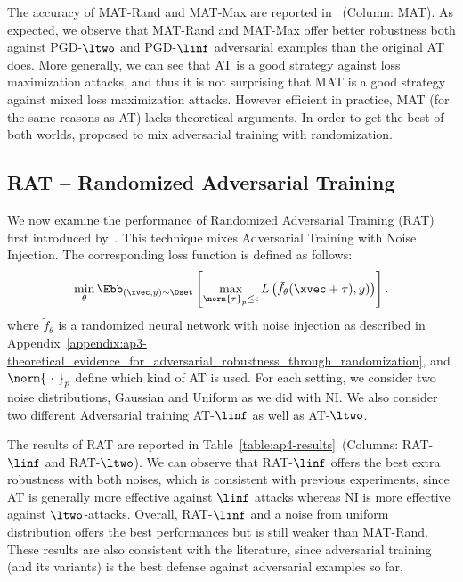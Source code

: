 The accuracy of MAT-Rand and MAT-Max are reported in~ (Column: MAT).
As expected, we observe that MAT-Rand and MAT-Max offer better robustness both against PGD-$\ltwo$ and PGD-$\linf$ adversarial examples than the original AT does.
More  generally, we can see that AT is a good strategy against loss maximization attacks, and thus it is not surprising that MAT is a good strategy against mixed loss maximization attacks.
However efficient in practice, MAT (for the same reasons as AT) lacks theoretical arguments.
In order to get the best of both worlds, \citet{salman2019provably} proposed to mix adversarial training with randomization.  


\subsection{RAT -- Randomized Adversarial Training}
\label{subsection:ap4-randomized_adversarial_training}

We now examine the performance of Randomized Adversarial Training (RAT) first introduced by~\citet{salman2019provably}.
This technique mixes Adversarial Training with Noise Injection.
The corresponding loss function is defined as follows:
\begin{equation}
  \min_{\theta} \Ebb_{(\xvec, y) \sim \Dset} \left[ \max_{\norm{\tau}_p \leq \epsilon} L\left( \tilde{f}_{\theta}(\xvec+\tau), y)  \right) \right].
\end{equation}
where $\tilde{f}_\theta$ is a randomized neural network with noise injection as described in Appendix~\ref{appendix:ap3-theoretical_evidence_for_adversarial_robustness_through_randomization}, and $\norm{\ \cdot\ }_p$ define which kind of AT is used.
For each setting, we consider two noise distributions, Gaussian and Uniform as we did with NI.
We also consider two different Adversarial training AT-$\linf$ as well as AT-$\ltwo$. 

The results of RAT are reported in Table~\ref{table:ap4-results}~(Columns: RAT-$\linf$ and RAT-$\ltwo$).
We can observe that RAT-$\linf$ offers the best extra robustness with both noises, which is consistent with previous experiments, since AT is generally more effective against $\linf$ attacks whereas NI is more effective against $\ltwo$-attacks.
Overall, RAT-$\linf$ and a noise from uniform distribution offers the best performances but is still weaker than MAT-Rand.
These results are also consistent with the literature, since adversarial training (and its variants) is the best defense against adversarial examples so far.


